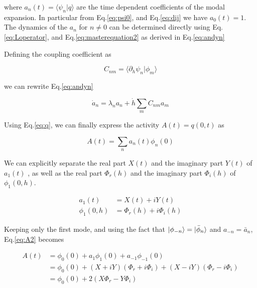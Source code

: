 \documentclass[12pt,twoside]{report}
\begin{document}
where $a_n(t)=\langle \psi_n | q\rangle$ are the time dependent coefficients of the modal expansion. In particular from Eq.\eqref{eq:psi0}, and Eq.\eqref{eq:dij} we have $a_0(t)=1$. The dynamics of the $a_n$ for $n\neq0$ can be determined directly using Eq.\eqref{eq:Loperator}, and Eq.\eqref{eq:masterequation2} as derived in Eq.\eqref{eq:andyn}


Defining the coupling coefficient as

\begin{equation}
\label{eq:couplingcoef}
 C_{nm}=\langle\partial_h\psi_n|\phi_m \rangle 
 \end{equation}

we can rewrite Eq.\eqref{eq:andyn}

\begin{equation}
\dot{a}_n=\lambda_n a_n +  \dot{h}\sum_mC_{nm}a_m 
\end{equation}

Using Eq.\eqref{eq:q}, we can finally express the activity $A(t)=q(0,t)$ as

\begin{equation}
\label{eq:A2}
A(t)=\sum_na_n(t)\phi_n(0)
\end{equation}

We can explicitly separate the real part $X(t)$ and the imaginary part  $Y(t)$ of $a_1(t)$ , as well as the real part $\Phi_r(h)$ and the imaginary part $\Phi_i(h)$ of $\phi_1(0,h)$.

\begin{align}
\label{eq:a1xy}
a_1(t)&= X(t) +i Y(t)\\
\phi_1(0,h)&= \Phi_r(h)+i\Phi_i(h)
\end{align}

 Keeping only the first mode, and using the fact that  $\ket{\phi_{-n}}=\ket{\bar{\phi}_n}$ and $a_{-n}=\bar{a}_n$,  Eq.\eqref{eq:A2} becomes

\begin{align}
\label{eq:A3}
A(t)&=\phi_0(0) + a_1\phi_1(0) +a_{-1}\phi_{-1}(0) \nonumber \\
&=\phi_0(0) + \left(X+iY\right)\left(\Phi_r+i\Phi_i\right)+\left(X-iY\right)\left(\Phi_r-i\Phi_i\right)\nonumber \\
&=\phi_0(0) + 2\left(X\Phi_r- Y\Phi_i\right)
\end{align}
\end{document}
